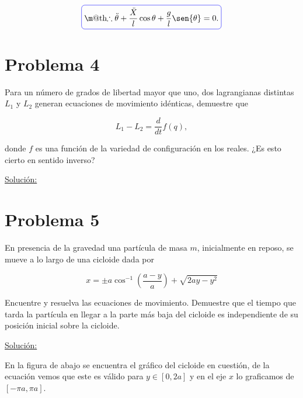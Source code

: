 \documentclass[a4paper,10pt]{article}
\makeatletter
\numberwithin{equation}{section}
\newcommand*{\boxcolor}{blue}
\renewcommand{\boxed}[1]{\textcolor{\boxcolor}{%
\tikz[baseline={([yshift=-1ex]current bounding box.center)}] \node [rectangle, minimum width=1ex,rounded corners,draw] {\normalcolor\m@th$\displaystyle#1$};}}
\makeatother
\begin{document}
\begin{equation}
 \boxed{\therefore \ddot{\theta}  + \frac{\ddot{X}}{l}\cos{\theta} + \frac{g}{l}\sen{\theta} = 0.}
\end{equation}



\section{Problema 4}

Para un número de grados de libertad mayor que uno, dos lagrangianas distintas $L_1$
y $L_2$ generan ecuaciones de movimiento idénticas, demuestre que 

$$
L_1 - L_2 = \frac{d}{dt}f(q),
$$

donde $f$ es una función de la variedad de configuración en los reales. ¿Es esto cierto 
en sentido inverso?

\vspace{.3cm}

\underline{Solución:} \vspace{.3cm}

\section{Problema 5}

En presencia de la gravedad una partícula de masa $m$, inicialmente en reposo, se 
mueve a lo largo de una cicloide dada por 

$$
x = \pm a \cos^{-1}{\left(\frac{a-y}{a}\right)} + \sqrt{2ay-y^2}
$$

Encuentre y resuelva las ecuaciones de movimiento. Demuestre que el tiempo que tarda 
la partícula en llegar a la parte más baja del cicloide es independiente de su 
posición inicial sobre la cicloide.

\vspace{.3cm}

\underline{Solución:} \vspace{.3cm}

En la figura de abajo se encuentra el gráfico del cicloide en cuestión, de la ecuación 
vemos que este es válido para $y \in [0,2a]$ y en el eje $x$ lo graficamos de $[-\pi a, \pi a]$.
\end{document}
